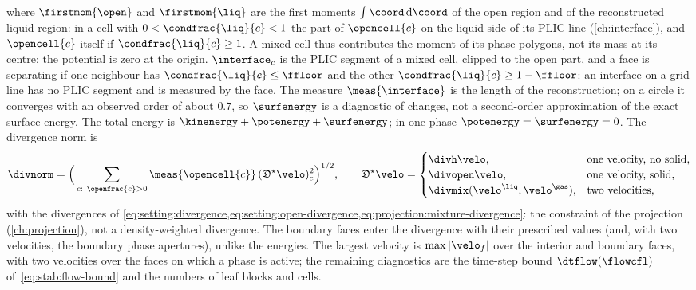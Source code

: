 where $\firstmom{\open}$ and $\firstmom{\liq}$ are the first moments
$\int\coord\dd\coord$ of the open region and of the reconstructed liquid
region: in a cell with $0<\condfrac{\liq}{c}<1$ the part of $\opencell{c}$ on
the liquid side of its PLIC line (\cref{ch:interface}), and $\opencell{c}$
itself if $\condfrac{\liq}{c}\ge1$. A mixed cell thus contributes the moment
of its phase polygons, not its mass at its centre; the potential is zero at
the origin. $\interface_c$ is the PLIC segment of a mixed cell, clipped to
the open part, and a face is separating if one neighbour has
$\condfrac{\liq}{c}\le\ffloor$ and the other $\condfrac{\liq}{c}\ge1-\ffloor$:
an interface on a grid line has no PLIC segment and is measured by the face.
The measure $\meas{\interface}$ is the length of the reconstruction; on a
circle it converges with an observed order of about $0.7$, so $\surfenergy$
is a diagnostic of changes, not a second-order approximation of the exact
surface energy.
The total energy is $\kinenergy+\potenergy+\surfenergy$; in one phase
$\potenergy=\surfenergy=0$.
The divergence norm is
\begin{equation}\label{eq:verif:divergence-norm}
  \divnorm=\Big(\sum_{c:\ \openfrac{c}>0}\meas{\opencell{c}}\,(\mathfrak{D}^{\star}\velo)_c^2\Big)^{1/2},\qquad
  \mathfrak{D}^{\star}\velo=\begin{cases}
    \divh\velo, & \text{one velocity, no solid},\\
    \divopen\velo, & \text{one velocity, solid},\\
    \divmix(\velo^{\liq},\velo^{\gas}), & \text{two velocities},
  \end{cases}
\end{equation}
with the divergences of \cref{eq:setting:divergence,eq:setting:open-divergence,eq:projection:mixture-divergence}:
the constraint of the projection (\cref{ch:projection}), not a
density-weighted divergence. The boundary faces enter the divergence with
their prescribed values (and, with two velocities, the boundary phase
apertures), unlike the energies. The largest velocity is $\max\abs{\velo_f}$ over
the interior and boundary faces, with two velocities over the faces on which
a phase is active; the remaining diagnostics are the time-step bound
$\dtflow(\flowcfl)$ of~\cref{eq:stab:flow-bound} and the numbers of leaf
blocks and cells.

